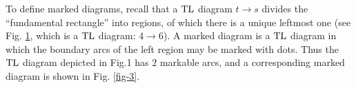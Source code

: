 \documentclass[12pt]{amsart}
\theoremstyle{definition}
\theoremstyle{remark}
\numberwithin{equation}{section}
\newcommand{\lr}{\longrightarrow}
\newcommand{\TL}{{\rm{TL}}}
\begin{document}
\begin{figure}[h]
\begin{center}
\end{center}
\caption{}\label{fig-2}
\end{figure}



To define marked diagrams, recall that a $\TL$ diagram $t\lr s$ divides the ``fundamental rectangle''  into regions,
of which there is a unique leftmost one (see Fig. \ref{fig-2}, which is a $\TL$ diagram: $4\lr 6$). A marked diagram is
a $\TL$ diagram in which the boundary arcs of the left region may be marked with dots. Thus the $\TL$ 
diagram depicted in Fig.1 has $2$ markable arcs, and a corresponding marked diagram is shown in Fig. \ref{fig-3}.
\end{document}
